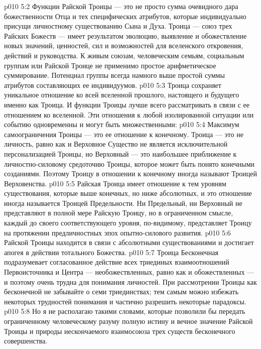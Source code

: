 \vs p010 5:2 Функции Райской Троицы --- это не просто сумма очевидного дара божественности Отца и тех специфических атрибутов, которые индивидуально присущи личностному существованию Сына и Духа. Троица --- союз трех Райских Божеств --- имеет результатом эволюцию, выявление и обожествление новых значений, ценностей, сил и возможностей для вселенского откровения, действий и руководства. К живым союзам, человеческим семьям, социальным группам или Райской Троице не применимо простое арифметическое суммирование. Потенциал группы всегда намного выше простой суммы атрибутов составляющих ее индивидуумов.
\vs p010 5:3 \pc Троица сохраняет уникальное отношение ко всей вселенной прошлого, настоящего и будущего именно как Троица. И функции Троицы лучше всего рассматривать в связи с ее отношением ко вселенной. Эти отношения к любой изолированной ситуации или событию одновременны и могут быть множественными:
\vs p010 5:4 \bibnobreakspace {} Максимум самоограничения Троицы --- это ее отношение к конечному. Троица --- это не личность, равно как и Верховное Существо не является исключительной персонализацией Троицы, но Верховный --- это наибольшее приближение к личностно\hyp{}силовому средоточию Троицы, которое может быть понято конечными созданиями. Поэтому Троицу в отношении к конечному иногда называют Троицей Верховенства.
\vs p010 5:5 \bibnobreakspace {} Райская Троица имеет отношение к тем уровням существования, которые выше конечных, но ниже абсолютных, и это отношение иногда называется Троицей Предельности. Ни Предельный, ни Верховный не представляют в полной мере Райскую Троицу, но в ограниченном смысле, каждый до своего соответствующего уровня, по\hyp{}видимому, представляет Троицу на протяжении предличностных эпох опытно\hyp{}силового развития.
\vs p010 5:6 \bibnobreakspace {} Райской Троицы находится в связи с абсолютными существованиями и достигает апогея в действии тотального Божества.
\vs p010 5:7 \pc Троица Бесконечная подразумевает согласованное действие всех триединых взаимоотношений Первоисточника и Центра --- необожествленных, равно как и обожествленных --- и поэтому очень трудна для понимания личностей. При рассмотрении Троицы как бесконечной не забывайте о семи триединствах; тем самым можно избежать некоторых трудностей понимания и частично разрешить некоторые парадоксы.
\vs p010 5:8 \pc Но я не располагаю такими словами, которые позволили бы передать ограниченному человеческому разуму полную истину и вечное значение Райской Троицы и природы нескончаемого взаимосоюза трех существ бесконечного совершенства.
